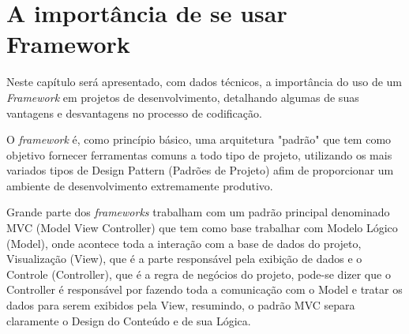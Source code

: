 \chapter{A import\^ancia de se usar Framework\label{cap:importancia}}
    Neste capítulo será apresentado, com dados técnicos, a importância do uso de um \emph{Framework} em projetos de desenvolvimento, detalhando algumas de suas vantagens e desvantagens no processo de codificação.

    O \emph{framework} é, como princ\'ipio b\'asico, uma arquitetura "padrão" que tem como objetivo fornecer ferramentas comuns a todo tipo de projeto, utilizando os mais variados tipos de Design Pattern (Padrões de Projeto) afim de proporcionar um ambiente de desenvolvimento extremamente produtivo.

    Grande parte dos \emph{frameworks} trabalham com um padrão principal denominado MVC (Model View Controller) que tem como base trabalhar com Modelo Lógico (Model), onde acontece toda a interação com a base de dados do projeto, Visualização (View), que é a parte responsável pela exibição de dados e o Controle (Controller), que é a regra de negócios do projeto, pode-se dizer que o Controller é responsável por fazendo toda a comunicação com o Model e tratar os dados para serem exibidos pela View, resumindo, o padrão MVC separa claramente o Design do Conteúdo e de sua Lógica.

